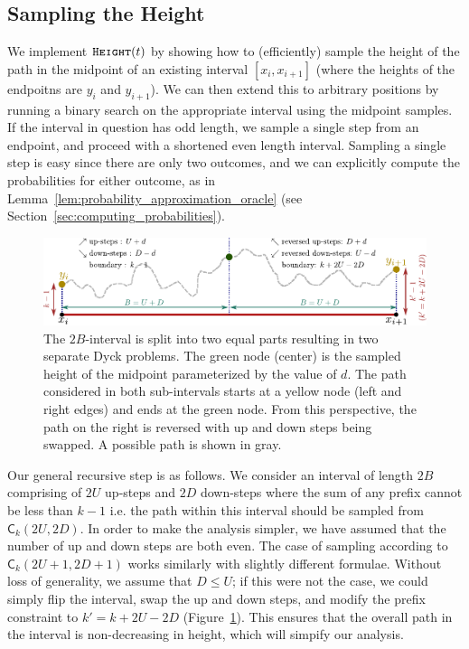 \subsection{Sampling the Height}
\label{sec:sampling_the_height}
We implement $\texttt{\textsc{Height}}(t)$ by showing how to (efficiently) sample the height of the path in the midpoint of an existing interval $[x_i, x_{i+1}]$
(where the heights of the endpoitns are $y_i$ and $y_{i+1}$).
We can then extend this to arbitrary positions by running a binary search on the appropriate interval using the midpoint samples.
If the interval in question has odd length, we sample a single step from an endpoint, and proceed with a shortened even length interval.
Sampling a single step is easy since there are only two outcomes, and we can explicitly compute the probabilities for either outcome,
as in Lemma~\ref{lem:probability_approximation_oracle} (see Section~\ref{sec:computing_probabilities}).
\begin{figure}[htpb]
    \centering
    \includegraphics[width=\textwidth]{images/dyck_height_sampling.pdf}
    \caption{The $2B$-interval is split into two equal parts resulting in two separate Dyck problems.
             The green node (center) is the sampled height of the midpoint parameterized by the value of $d$.
             The path considered in both sub-intervals starts at a yellow node (left and right edges) and ends at the green node.
             From this perspective, the path on the right is reversed with up and down steps being swapped.
             A possible path is shown in gray.}
    \label{fig:dyck_height_sampling}
\end{figure}

Our general recursive step is as follows.
We consider an interval of length $2B$ comprising of $2U$ up-steps and $2D$ down-steps where the sum of any prefix cannot be less than $k-1$
i.e. the path within this interval should be sampled from $\mathsf C_k(2U,2D)$.
In order to make the analysis simpler, we have assumed that the number of up and down steps are both even.
The case of sampling according to $\mathsf C_k(2U+1, 2D+1)$ works similarly with slightly different formulae.
Without loss of generality, we assume that $D\le U$; if this were not the case, we could simply flip the interval,
swap the up and down steps, and modify the prefix constraint to $k'=k+2U-2D$ (Figure~\ref{fig:dyck_height_sampling}).
This ensures that the overall path in the interval is non-decreasing in height, which will simpify our analysis.

